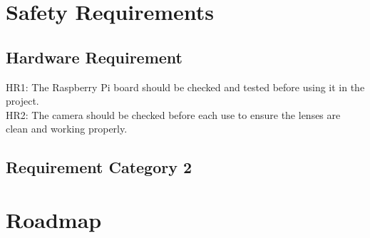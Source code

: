 \documentclass{article}
\begin{document}
\section{Safety Requirements}
\subsection{Hardware Requirement}
HR1: The Raspberry Pi board should be checked and tested before using it in the project.\\
HR2: The camera should be checked before each use to ensure the lenses are clean and working properly.

\subsection{Requirement Category 2}

\section{Roadmap}
\end{document}
